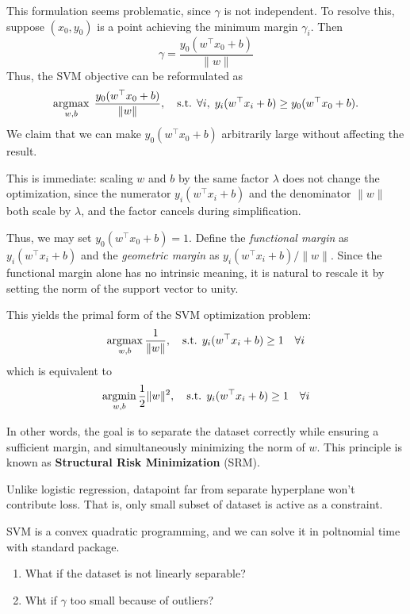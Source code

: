 \documentclass[../main]{subfiles}
\begin{document}
This formulation seems problematic, since $\gamma$ is not independent.  
To resolve this, suppose $(x_0, y_0)$ is a point achieving the minimum margin $\gamma_i$.  
Then
\begin{equation}
    \gamma = \frac{y_0 (w^\top x_0 + b)}{\|w\|}
\end{equation}
Thus, the SVM objective can be reformulated as
\begin{equation}
    \mathop{\mathrm{argmax}}_{w,b} \; \frac{y_0 (w^\top x_0 + b)}{\|w\|}, 
    \quad \text{s.t. } \forall i, \; y_i (w^\top x_i + b) \geq y_0 (w^\top x_0 + b).
\end{equation}
We claim that we can make $y_0(w^\top x_0 + b)$ arbitrarily large without affecting the result.

\begin{remark}
    This is immediate: scaling $w$ and $b$ by the same factor $\lambda$ does not change the optimization, since the numerator $y_i(w^\top x_i + b)$ and the denominator $\|w\|$ both scale by $\lambda$, and the factor cancels during simplification.
\end{remark}

Thus, we may set $y_0(w^\top x_0 + b) = 1$.  
Define the \emph{functional margin} as $y_i(w^\top x_i + b)$ and the \emph{geometric margin} as $y_i(w^\top x_i + b)/\|w\|$.  
Since the functional margin alone has no intrinsic meaning, it is natural to rescale it by setting the norm of the support vector to unity.  
\vspace{0.5em}

This yields the primal form of the SVM optimization problem:
\begin{equation}
    \mathop{\mathrm{argmax}}_{w,b} \frac{1}{\|w\|}, 
    \quad \text{s.t. } y_i (w^\top x_i + b) \geq 1 \quad \forall i
\end{equation}
which is equivalent to
\begin{equation}
    \mathop{\mathrm{argmin}}_{w,b} \frac{1}{2} \|w\|^2, 
    \quad \text{s.t. } y_i (w^\top x_i + b) \geq 1 \quad \forall i
\end{equation}

In other words, the goal is to separate the dataset correctly while ensuring a sufficient margin, and simultaneously minimizing the norm of $w$.  
This principle is known as \textbf{Structural Risk Minimization} (SRM).

\begin{remark}
    Unlike logistic regression, datapoint far from separate hyperplane won't contribute loss. That is, only small subset of dataset is active as a constraint.
\end{remark}
\begin{proposition}
    SVM is a convex quadratic programming, and we can solve it in poltnomial time with standard package.
\end{proposition}
\begin{problem}
\begin{enumerate}
    \item What if the dataset is not linearly separable?
    \item Wht if $\gamma$ too small because of outliers?
\end{enumerate}
\end{problem}
\end{document}
